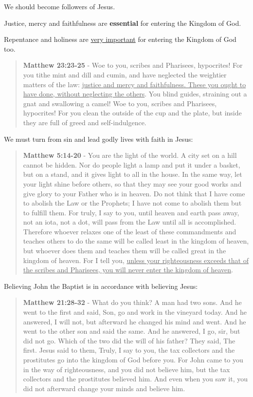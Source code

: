\documentclass[11pt]{article}
\begin{document}
We should become followers of Jesus.

Justice, mercy and faithfulness are \textbf{essential} for entering the Kingdom of God.

Repentance and holiness are \uline{very important} for entering the Kingdom of God too.

\begin{quote}
\textbf{Matthew 23:23-25} - Woe to you, scribes and Pharisees, hypocrites! For you tithe mint and dill and cumin, and have neglected the weightier matters of the law: \uline{justice and mercy and faithfulness. These you ought to have done, without neglecting the others}. You blind guides, straining out a gnat and swallowing a camel! Woe to you, scribes and Pharisees, hypocrites! For you clean the outside of the cup and the plate, but inside they are full of greed and self-indulgence.
\end{quote}

We must turn from sin and lead godly lives with faith in Jesus:

\begin{quote}
\textbf{Matthew 5:14-20} - You are the light of the world. A city set on a hill cannot be hidden. Nor do people light a lamp and put it under a basket, but on a stand, and it gives light to all in the house. In the same way, let your light shine before others, so that they may see your good works and give glory to your Father who is in heaven. Do not think that I have come to abolish the Law or the Prophets; I have not come to abolish them but to fulfill them. For truly, I say to you, until heaven and earth pass away, not an iota, not a dot, will pass from the Law until all is accomplished. Therefore whoever relaxes one of the least of these commandments and teaches others to do the same will be called least in the kingdom of heaven, but whoever does them and teaches them will be called great in the kingdom of heaven. For I tell you, \uline{unless your righteousness exceeds that of the scribes and Pharisees, you will never enter the kingdom of heaven}.
\end{quote}

Believing John the Baptist is in accordance with believing Jesus:

\begin{quote}
\textbf{Matthew 21:28-32} - What do you think? A man had two sons. And he went to the first and said, Son, go and work in the vineyard today. And he answered, I will not, but afterward he changed his mind and went. And he went to the other son and said the same. And he answered, I go, sir, but did not go. Which of the two did the will of his father? They said, The first. Jesus said to them, Truly, I say to you, the tax collectors and the prostitutes go into the kingdom of God before you. For John came to you in the way of righteousness, and you did not believe him, but the tax collectors and the prostitutes believed him. And even when you saw it, you did not afterward change your minds and believe him.
\end{quote}
\end{document}
